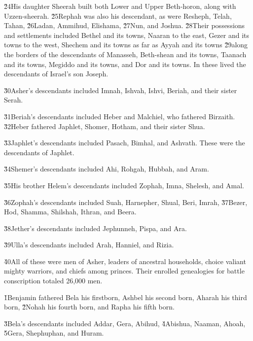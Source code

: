 \v{24}His daughter Sheerah built both Lower and Upper Beth-horon, along with Uzzen-sheerah. \v{25}Rephah was also his descendant, as were Resheph, Telah, Tahan, \v{26}Ladan, Ammihud, Elishama, \v{27}Nun, and Joshua. \v{28}Their possessions and settlements included Bethel and its towns, Naaran to the east, Gezer and its towns to the west, Shechem and its towns as far as Ayyah and its towns \v{29}along the borders of the descendants of Manasseh, Beth-shean and its towns, Taanach and its towns, Megiddo and its towns, and Dor and its towns. In these lived the descendants of Israel's son Joseph.

\v{30}Asher's descendants included Imnah, Ishvah, Ishvi, Beriah, and their sister Serah.

\v{31}Beriah's descendants included Heber and Malchiel, who fathered Birzaith. \v{32}Heber fathered Japhlet, Shomer, Hotham, and their sister Shua.

\v{33}Japhlet's descendants included Pasach, Bimhal, and Ashvath. These were the descendants of Japhlet.

\v{34}Shemer's descendants included Ahi, Rohgah, Hubbah, and Aram.

\v{35}His brother Helem's descendants included Zophah, Imna, Shelesh, and Amal.

\v{36}Zophah's descendants included Suah, Harnepher, Shual, Beri, Imrah, \v{37}Bezer, Hod, Shamma, Shilshah, Ithran, and Beera.

\v{38}Jether's descendants included Jephunneh, Pispa, and Ara.

\v{39}Ulla's descendants included Arah, Hanniel, and Rizia.

\v{40}All of these were men of Asher, leaders of ancestral households, choice valiant mighty warriors, and chiefs among princes. Their enrolled genealogies for battle conscription totaled 26,000 men.

\v{1}Benjamin fathered Bela his firstborn, Ashbel his second born, Aharah his third born, \v{2}Nohah his fourth born, and Rapha his fifth born.

\v{3}Bela's descendants included Addar, Gera, Abihud, \v{4}Abishua, Naaman, Ahoah, \v{5}Gera, Shephuphan, and Huram.

